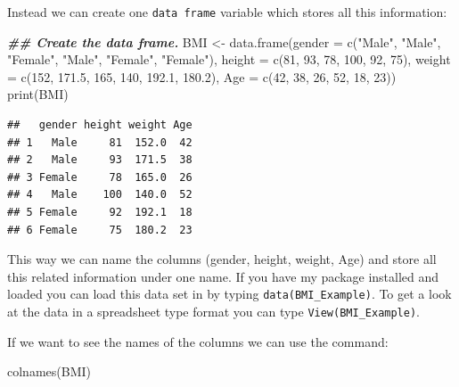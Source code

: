 \documentclass[
]{book}
\newenvironment{Shaded}{\begin{snugshade}}{\end{snugshade}}
\newcommand{\AttributeTok}[1]{\textcolor[rgb]{0.77,0.63,0.00}{#1}}
\newcommand{\DecValTok}[1]{\textcolor[rgb]{0.00,0.00,0.81}{#1}}
\newcommand{\DocumentationTok}[1]{\textcolor[rgb]{0.56,0.35,0.01}{\textbf{\textit{#1}}}}
\newcommand{\FloatTok}[1]{\textcolor[rgb]{0.00,0.00,0.81}{#1}}
\newcommand{\FunctionTok}[1]{\textcolor[rgb]{0.00,0.00,0.00}{#1}}
\newcommand{\NormalTok}[1]{#1}
\newcommand{\OtherTok}[1]{\textcolor[rgb]{0.56,0.35,0.01}{#1}}
\newcommand{\StringTok}[1]{\textcolor[rgb]{0.31,0.60,0.02}{#1}}
\theoremstyle{definition}
\theoremstyle{definition}
\theoremstyle{definition}
\theoremstyle{definition}
\theoremstyle{remark}
\begin{document}
Instead we can create one \texttt{data\ frame} variable which stores all this information:

\begin{Shaded}
\begin{Highlighting}[]
\DocumentationTok{\#\# Create the data frame.}
\NormalTok{BMI }\OtherTok{\textless{}{-}} \FunctionTok{data.frame}\NormalTok{(}\AttributeTok{gender =} \FunctionTok{c}\NormalTok{(}\StringTok{"Male"}\NormalTok{, }\StringTok{"Male"}\NormalTok{, }\StringTok{"Female"}\NormalTok{, }\StringTok{"Male"}\NormalTok{, }\StringTok{"Female"}\NormalTok{, }\StringTok{"Female"}\NormalTok{),}
    \AttributeTok{height =} \FunctionTok{c}\NormalTok{(}\DecValTok{81}\NormalTok{, }\DecValTok{93}\NormalTok{, }\DecValTok{78}\NormalTok{, }\DecValTok{100}\NormalTok{, }\DecValTok{92}\NormalTok{, }\DecValTok{75}\NormalTok{), }\AttributeTok{weight =} \FunctionTok{c}\NormalTok{(}\DecValTok{152}\NormalTok{, }\FloatTok{171.5}\NormalTok{, }\DecValTok{165}\NormalTok{, }\DecValTok{140}\NormalTok{, }\FloatTok{192.1}\NormalTok{,}
        \FloatTok{180.2}\NormalTok{), }\AttributeTok{Age =} \FunctionTok{c}\NormalTok{(}\DecValTok{42}\NormalTok{, }\DecValTok{38}\NormalTok{, }\DecValTok{26}\NormalTok{, }\DecValTok{52}\NormalTok{, }\DecValTok{18}\NormalTok{, }\DecValTok{23}\NormalTok{))}
\FunctionTok{print}\NormalTok{(BMI)}
\end{Highlighting}
\end{Shaded}

\begin{verbatim}
##   gender height weight Age
## 1   Male     81  152.0  42
## 2   Male     93  171.5  38
## 3 Female     78  165.0  26
## 4   Male    100  140.0  52
## 5 Female     92  192.1  18
## 6 Female     75  180.2  23
\end{verbatim}

This way we can name the columns (gender, height, weight, Age) and store all this related information under one name. If you have my package installed and loaded you can load this data set in by typing \texttt{data(BMI\_Example)}. To get a look at the data in a spreadsheet type format you can type \texttt{View(BMI\_Example)}.

If we want to see the names of the columns we can use the command:

\begin{Shaded}
\begin{Highlighting}[]
\FunctionTok{colnames}\NormalTok{(BMI)}
\end{Highlighting}
\end{Shaded}
\end{document}
